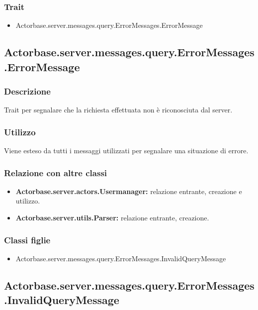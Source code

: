 \documentclass[a4paper]{article}
\begin{document}
			\subsubsection{Trait}
				\begin{itemize}
					\item Actorbase.server.messages.query.ErrorMessages.ErrorMessage
				\end{itemize}
				
		\subsection{Actorbase.server.messages.query.ErrorMessages.ErrorMessage}
			\subsubsection{Descrizione}
				Trait per segnalare che la richiesta effettuata non è riconosciuta dal server.
				
			\subsubsection{Utilizzo}
				Viene esteso da tutti i messaggi utilizzati per segnalare una situazione di errore.
				
			\subsubsection{Relazione con altre classi}
				\begin{itemize}
					\item \textbf{Actorbase.server.actors.Usermanager:} relazione entrante, creazione e utilizzo.
					\item \textbf{Actorbase.server.utils.Parser:} relazione entrante, creazione.
				\end{itemize}
				
			\subsubsection{Classi figlie}
				\begin{itemize}
					\item Actorbase.server.messages.query.ErrorMessages.InvalidQueryMessage
				\end{itemize}
				
		\subsection{Actorbase.server.messages.query.ErrorMessages.InvalidQueryMessage}
\end{document}
